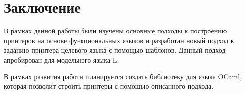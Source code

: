 \section*{Заключение}

В рамках данной работы были изучены основные подходы к построению принтеров на основе функциональных языков и
разработан новый подход к заданию принтера целевого языка с помощью шаблонов. Данный подход апробирован для модельного языка L. 

В рамках развития работы планируется создать библиотеку для языка OCaml, которая позволит строить принтеры с помощью описанного
подхода.
